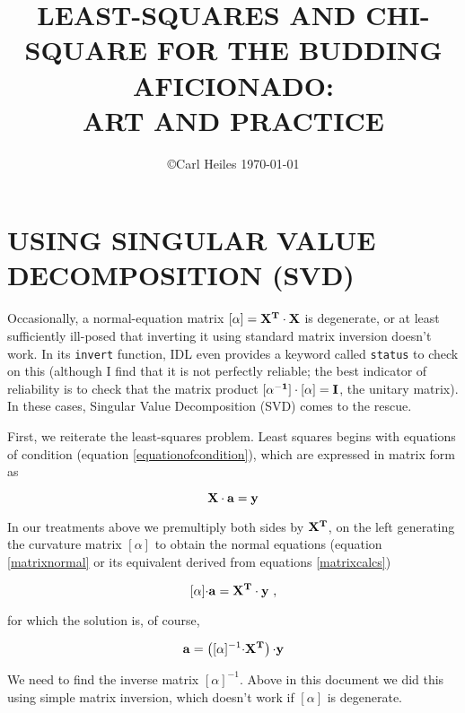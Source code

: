 \documentclass[psfig,preprint]{aastex}
\begin{document}
\setcounter{section}{-1}

\title{LEAST-SQUARES AND CHI-SQUARE FOR THE BUDDING AFICIONADO: \\ 
ART AND PRACTICE } 

\author{\copyright Carl Heiles \today }


\section{USING SINGULAR VALUE DECOMPOSITION (SVD)} \label{SVD}

	Occasionally, a normal-equation matrix $[\alpha] = {\bf X^T
\cdot X}$ is degenerate, or at least sufficiently ill-posed that
inverting it using standard matrix inversion doesn't work.  In its
\verb$invert$ function, IDL even provides a keyword called \verb$status$
to check on this (although I find that it is not perfectly reliable; the
best indicator of reliability is to check that the matrix product ${\bf
[\alpha ^{-1}] \cdot [\alpha]} = {\bf I}$, the unitary matrix).  In
these cases, Singular Value Decomposition (SVD) comes to the rescue. 

	First, we reiterate the least-squares problem.  Least squares
begins with equations of condition (equation \ref{equationofcondition}),
which are expressed in matrix form as

\begin{equation} \label{eqnofcond}
{\bf X \cdot a} = {\bf y}
\end{equation}

\noindent In our treatments above we premultiply both sides by $\bf
X^T$, on the left generating the curvature matrix $[\alpha]$ to obtain
the normal equations (equation \ref{matrixnormal} or its equivalent
derived from equations \ref{matrixcalcs})

\begin{equation} \label{alphabeta1}
[\alpha] {\bf \cdot a} =  {\bf X^T \cdot y} \ ,
\end{equation}

\noindent for which the solution is, of course,

\begin{equation} \label{alphabeta2}
{\bf a} =  \left( [\alpha]^{-1} {\bf \cdot X^T} \right) {\bf \cdot y}
\end{equation}

\noindent We need to find the inverse matrix $[\alpha]^{-1}$. Above in
this document we did this using simple matrix inversion, which doesn't
work if $[\alpha]$ is degenerate. 
\end{document}
